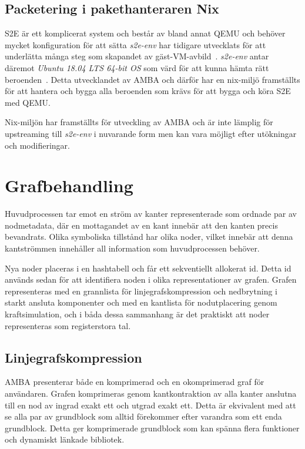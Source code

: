 \subsection{Packetering i pakethanteraren Nix}

S2E är ett komplicerat system och består av bland annat QEMU och behöver mycket
konfiguration för att sätta %
\textit{s2e-env} har tidigare utvecklats för att underlätta många steg som
skapandet av gäst-VM-avbild~\cite{s2e_website_s2eenv}. \textit{s2e-env} antar
däremot \textit{Ubuntu 18.04 LTS 64-bit OS} som värd för att kunna hämta rätt
beroenden~\cite{s2eenv_github}. Detta %
utvecklandet av AMBA och därför har en nix-miljö framställts för att hantera och
bygga alla beroenden som krävs för att bygga och köra S2E med QEMU.

Nix-miljön har framställts för utveckling av AMBA och är inte lämplig för
upstreaming till \textit{s2e-env} i nuvarande form men kan vara möjligt efter
utökningar och modifieringar.

\section{Grafbehandling}

Huvudprocessen tar emot en ström av kanter representerade som ordnade par av
nodmetadata, där en mottagandet av en kant innebär att den kanten precis
bevandrats. Olika symboliska tillstånd har olika noder, vilket innebär att denna
kantströmmen innehåller all information som huvudprocessen behöver.

Nya noder placeras i en hashtabell och får ett sekventiellt allokerat id. Detta
id används sedan för att identifiera noden i olika representationer av grafen.
Grafen representeras med en grannlista för linjegrafskompression och nedbrytning
i starkt ansluta komponenter och med en kantlista för nodutplacering genom
kraftsimulation, och i båda dessa sammanhang är det praktiskt att noder
representeras som registerstora tal.

\subsection{Linjegrafskompression}

AMBA presenterar både en komprimerad och en okomprimerad graf för användaren.
Grafen komprimeras genom kantkontraktion av alla kanter anslutna till en nod av
ingrad exakt ett och utgrad exakt ett. Detta är ekvivalent med att se alla par
av grundblock som alltid förekommer efter varandra som ett enda grundblock.
Detta ger komprimerade grundblock som kan spänna flera funktioner och dynamiskt
länkade bibliotek.

